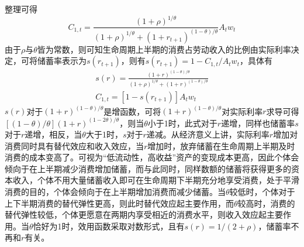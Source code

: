 \documentclass[supercite]{HustGraduPaper}
\begin{document}
    整理可得
    \begin{equation}
    C_{1,t}=\frac{(1+\rho)^{1/\theta}}{(1+\rho)^{1/\theta}+(1+r_{t+1})^{(1-\theta)/\theta}}A_tw_t
    \end{equation}
    由于$\rho$与$\theta$皆为常数，则可知生命周期上半期的消费占劳动收入的比例由实际利率决定，可将储蓄率表示为$s(r_{t+1})$，则有$s(r_{t+1})=1-C_{1,t}/A_tw_t$，具体有
    \begin{equation}
    \begin{aligned}
    s(r)=\frac{(1+r)^{(1-\theta)/\theta}}{(1+\rho)^{1/\theta}+(1+r)^{(1-\theta)/\theta}}\\
    C_{1,t}=[1-s(r_{t+1})]A_tw_t
    \end{aligned}
    \end{equation}
    $s(r)$对于$(1+r)^{(1-\theta)/\theta}$是增函数，可将$(1+r)^{(1-\theta)/\theta}$对实际利率$r$求导可得$[(1-\theta)/\theta](1+r)^{(1-2\theta)/\theta}$，则当$\theta$小于1时，此式对于$r$递增，同样也储蓄率$s$对于$r$递增，相反，当$\theta$大于1时，$s$对于$r$递减。从经济意义上讲，实际利率$r$增加对消费同时具有替代效应和收入效应，当$r$增加时，放弃储蓄在生命周期上半期及时消费的成本变高了。可视为“低流动性，高收益”资产的变现成本更高，因此个体会倾向于在上半期减少消费增加储蓄，而与此同时，同样数额的储蓄将获得更多的资本收入，个体不用大量储蓄收入即可在生命周期下半期充分地享受消费，处于平滑消费的目的，个体会倾向于在上半期增加消费而减少储蓄。当$\theta$较低时，个体对于上下半期消费的替代弹性更高，则此时替代效应起主要作用，而$\theta$较高时，消费的替代弹性较低，个体更愿意在两期内享受相近的消费水平，则收入效应起主要作用。当$\theta$恰好为1时，效用函数采取对数形式，且有$s(r)=1/(2+\rho)$，储蓄率不再和$r$有关。
\end{document}
